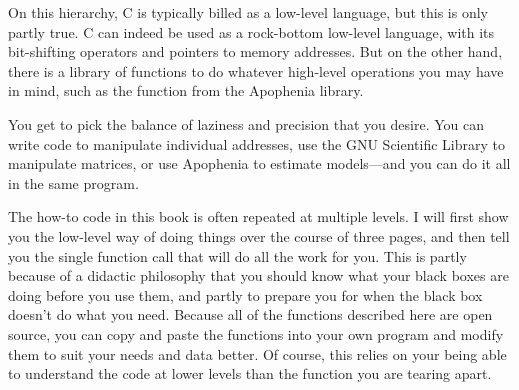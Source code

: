 {On this hierarchy, C is typically billed as a low-level language,
but this is only partly true. C can indeed be used as a rock-bottom
low-level language, with its bit-shifting operators and pointers to
memory addresses.  But on the other hand, there is a library of functions
to do whatever high-level operations you may have in mind, such as the
 function from the Apophenia library.

You get to pick the balance of laziness and precision that you desire. You
can write code to manipulate individual addresses, use the GNU Scientific
Library to manipulate matrices, or use Apophenia to estimate models---and
you can do it all in the same program.

The how-to code in this book is often repeated at multiple levels. I will first
show you the low-level way of doing things over the course of three
pages, and then tell you the single function call that will do all the work
for you. This is partly because of a didactic philosophy that you should
know what your black boxes are doing before you use them, and partly
to prepare you for when the black box doesn't do what you need. Because all of the
functions described here are open source, you can copy and paste the
functions into your own program and modify them to suit your needs
and data better. Of course, this relies on your being able to understand
the code at lower levels than the function you are tearing apart.
\fi
}
